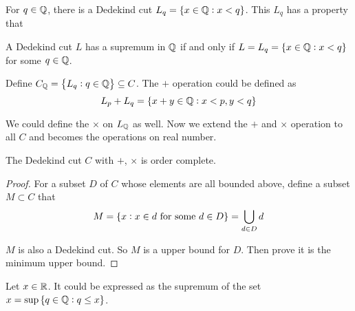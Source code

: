 For $q \in \mathbb{Q}$, there is a Dedekind cut $L_q = \set{x\in \mathbb{Q}: x < q}$. This $L_q$ has a property that
\begin{theorem}
    A Dedekind cut $L$ has a supremum in $\mathbb{Q}$ if and only if $L = L_q = \set{x \in \mathbb{Q}: x < q}$ for some $q\in \mathbb{Q}$.
\end{theorem}

\begin{definition}
    Define $C_{\mathbb{Q}} = \set{L_q: q \in \mathbb{Q}} \subseteq C$. The $+$ operation could be defined as
\begin{equation}
    L_p + L_q = \set{x + y \in \mathbb{Q}: x < p, y < q}
\end{equation}
\end{definition}


We could define the $\times$ on $L_{\mathbb{Q}}$ as well. Now we extend the $+$ and $\times$ operation to all $C$ and becomes the operations on real number.

\begin{theorem}\label{dedekind_real_order_complete}
    The Dedekind cut $C$ with $+$, $\times$ is order complete.    
\end{theorem}
\begin{proof}
    For a subset $D$ of $C$ whose elements are all bounded above, define a subset $M \subset C$ that
    \begin{equation}
        M = \set{x: x \in d \text{ for some } d \in D} =\bigcup_{d \in D} d
    \end{equation}
    
    $M$ is also a Dedekind cut. So $M$ is a upper bound for $D$. Then prove it is the minimum upper bound.
\end{proof}


\begin{theorem}
Let $x \in \mathbb{R}$. It could be expressed as the supremum of the set $x = \sup \set{q \in \mathbb{Q}: q \leq x}$.
\end{theorem}



